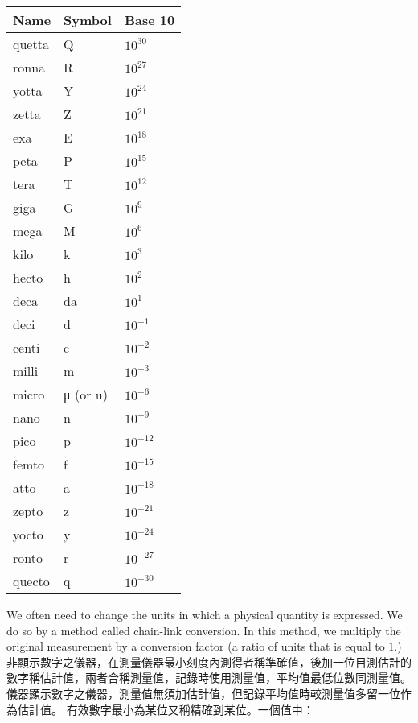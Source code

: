 \documentclass[a4paper,12pt]{article}
\begin{document}
\begin{longtable}[c]{|p{0.15\tw}|p{0.15\tw}|p{0.15\tw}|}
\hline
Name & Symbol & Base 10 \\\hline\endhead
quetta & Q & $10^{30}$ \\\hline
ronna & R & $10^{27}$ \\\hline
yotta & Y & $10^{24}$ \\\hline
zetta & Z & $10^{21}$ \\\hline
exa & E & $10^{18}$ \\\hline
peta & P & $10^{15}$ \\\hline
tera & T & $10^{12}$ \\\hline
giga & G & $10^{9}$ \\\hline
mega & M & $10^{6}$ \\\hline
kilo & k & $10^{3}$ \\\hline
hecto & h & $10^{2}$ \\\hline
deca & da & $10^{1}$ \\\hline
deci & d & $10^{-1}$ \\\hline
centi & c & $10^{-2}$ \\\hline
milli & m & $10^{-3}$ \\\hline
micro & μ (or u) & $10^{-6}$ \\\hline
nano & n & $10^{-9}$ \\\hline
pico & p & $10^{-12}$ \\\hline
femto & f & $10^{-15}$ \\\hline
atto & a & $10^{-18}$ \\\hline
zepto & z & $10^{-21}$ \\\hline
yocto & y & $10^{-24}$ \\\hline
ronto & r & $10^{-27}$ \\\hline
quecto & q & $10^{-30}$ \\\hline
\end{longtable}\FB
{}
We often need to change the units in which a physical quantity is expressed. We do so by a method called chain-link conversion. In this method, we multiply the original measurement by a conversion factor (a ratio of units that is equal to $1$.)
非顯示數字之儀器，在測量儀器最小刻度內測得者稱準確值，後加一位目測估計的數字稱估計值，兩者合稱測量值，記錄時使用測量值，平均值最低位數同測量值。儀器顯示數字之儀器，測量值無須加估計值，但記錄平均值時較測量值多留一位作為估計值。
有效數字最小為某位又稱精確到某位。一個值中：
\end{document}
